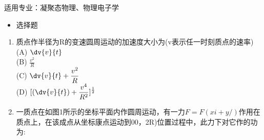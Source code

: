 适用专业：凝聚态物理、物理电子学
\begin{itemize}
\item 选择题
\end{itemize}
\begin{enumerate}
\item 质点作半径为R的变速圆周运动的加速度大小为(v表示任一时刻质点的速率)\\
(A) $\displaystyle \dv{v}{t}$\\
(B) $\displaystyle \frac{v^2}{R}$\\
(C) $\displaystyle \dv{v}{t}+\frac{v^2}{R}$\\
(D) $\displaystyle [(\dv{v}{t})+\frac{v^4}{R^2}]^\frac{1}{2}$
\item 一质点在如图1所示的坐标平面内作圆周运动，有一力$F=F(xi+y/)$作用在质点上，在该成点从坐标康点运动到00，2R)位置过程中，此力下对它作的功为:
\end{enumerate}
